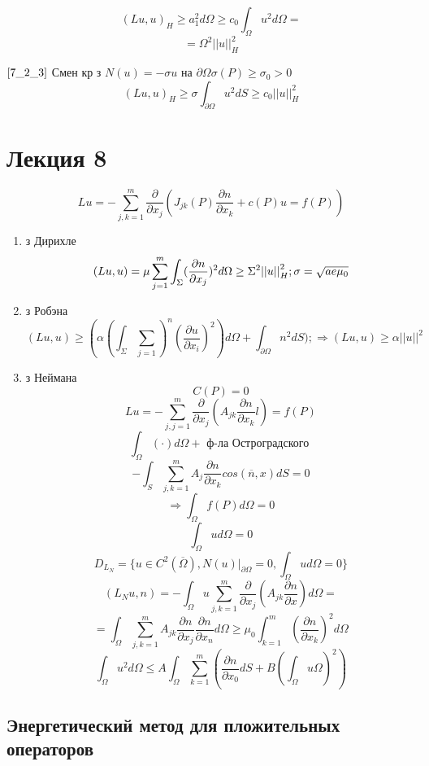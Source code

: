 \documentclass[12pt, a4paper]{article}
\begin{document}
\[ (Lu,u)_H \geq a_1^2 d\Omega \geq c_0 \int_{\Omega}^{} u^2 d\Omega =\]
\[ = \Omega^2 ||u||^2_H \]

$ \ref{7_2_3} $ Смен кр з $ N(u) = -\sigma u $ на $ \partial  \Omega \sigma (P) \geq \sigma_0 > 0$
\[ (Lu, u)_H \geq \sigma \int_{ \partial  \Omega}^{} u^2 dS \geq c_0 ||u||^2_H \]

\section{Лекция 8}

\[ Lu = - \sum_{j,k=1}^{m} \frac{\partial }{\partial  x_j} (J_{jk}(P)\frac{\partial n}{\partial x_k} + c(P)u = f(P)) \label{8_1_1}\]

\begin{enumerate}
	\item з Дирихле
	\[ (Lu, u) = \mu \sum_{j=1}^{m} \int_{\Sigma}^{}(\frac{\partial n}{\partial x_j})^2 d\Omega \geq \Sigma^2 {||u||}^2_H; \sigma = \sqrt{\\ae \mu_0}\]
	\item з Робэна $\label{8_3}$
	\[ (Lu, u) \geq (\alpha {(\int_{\Sigma}^{} \sum_{j=1})}^{n}(\frac{\partial u}{\partial x_i})^2) d\Omega + \int_{\partial \Omega}^{}n^2 dS) ; \Rightarrow (Lu, u) \geq \alpha {||u||}^2 \]
	\item з Неймана
	\[ C(P) = 0 \]
	\[ Lu = -\sum_{j,j =1}^{m}\frac{\partial}{\partial  x_j}(A_{jk} \frac{\partial n}{\partial x_k}l) = f(P) \]
	\[ \int_{\Omega}^{}(\cdot) d \Omega + \textrm{ ф-ла Остроградского } \]
	\[ -\int_{S}^{} \sum_{j,k = 1}^{m} A_j \frac{\partial n}{\partial x_k} cos( \overline{n}, x) dS = 0 \]
	\[ \Rightarrow \int_{\Omega}^{}f(P) d \Omega = 0 \]
	\[ \int_{\Omega}^{} u d\Omega = 0 \]
	\[ D_{L_N} = \{ u \in C^2 ( \overline{\Omega}), N(u)|_{\partial \Omega} = 0, \int_{\Omega}^{}u d \Omega = 0 \} \]
	\[ (L_N u, n) = -\int_{\Omega}^{} u \sum_{j,k=1}^{m} \frac{\partial }{\partial x_j}(A_{jk} \frac{\partial n}{\partial x}) d\Omega = \]
	\[ = \int_{\Omega}^{} \sum_{j,k=1}^{m} A_{jk} \frac{\partial n}{\partial x_j} \frac{\partial n}{\partial  x_n} d \Omega \geq \mu_0 \int_{k=1}^{m} (\frac{\partial n}{\partial x_k})^2 d\Omega \]
	\[ \int_{\Omega}^{} u^2 d\Omega \leq A \int_{\Omega}^{} \sum_{k = 1}^{m} (\frac{\partial  n}{\partial x_0}dS + B (\int_{\Omega}^{} u \Omega)^2)\]

\end{enumerate}

\subsection{Энергетический метод для пложительных операторов}
\end{document}

